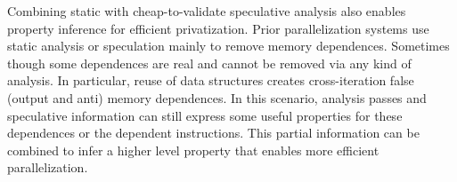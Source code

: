 Combining static with cheap-to-validate speculative analysis also
enables property inference for efficient privatization.
%
Prior parallelization systems
use static analysis or speculation mainly to remove memory
dependences.  Sometimes though some dependences are real and cannot be
removed via any kind of analysis.
In particular, reuse of data structures creates cross-iteration false
(output and anti) memory dependences.
%
In this scenario, analysis passes and speculative information can
still express some useful properties for these dependences or the
dependent instructions.  This partial information can be combined to
infer a higher level property that enables more efficient
parallelization.


%
%
%

%
%

